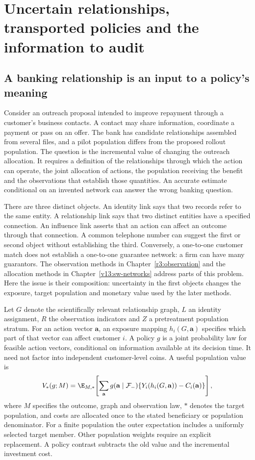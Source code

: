 \chapter{Uncertain relationships, transported policies and the information to audit}
\label{exec17:s7}

\section{A banking relationship is an input to a policy's meaning}
\label{exec17:s7-question}

Consider an outreach proposal intended to improve repayment through a customer's
business contacts. A contact may share information, coordinate a payment or pass
on an offer. The bank has candidate relationships assembled from several files,
and a pilot population differs from the proposed rollout population. The question
is the incremental value of changing the outreach allocation. It requires a
definition of the relationships through which the action can operate, the joint
allocation of actions, the population receiving the benefit and the observations
that establish those quantities. An accurate estimate conditional on an invented
network can answer the wrong banking question.

There are three distinct objects. An identity link says that two records refer
to the same entity. A relationship link says that two distinct entities have a
specified connection. An influence link asserts that an action can affect an
outcome through that connection. A common telephone number can suggest the first
or second object without establishing the third. Conversely, a one-to-one
customer match does not establish a one-to-one guarantee network: a firm can have
many guarantors. The observation methods in Chapter~\ref{r3:observation} and the
allocation methods in Chapter~\ref{v13:sw-networks} address parts of this problem.
Here the issue is their composition: uncertainty in the first objects changes
the exposure, target population and monetary value used by the later methods.

Let $G$ denote the scientifically relevant relationship graph, $L$ an identity
assignment, $R$ the observation indicators and $Z$ a pretreatment population
stratum. For an action vector $\mathbf a$, an exposure mapping
$h_i(G,\mathbf a)$ specifies which part of that vector can affect customer $i$.
A policy $g$ is a joint probability law for feasible action vectors, conditional
on information available at its decision time. It need not factor into
independent customer-level coins. A useful population value is
\begin{equation}
 V_*(g;M)=\E_{M,*}\!\left[
   \sum_{\mathbf a}g(\mathbf a\mid\mathcal F_{-})
     \{Y_i(h_i(G,\mathbf a))-C_i(\mathbf a)\}\right],
 \label{exec17:s7-target}
\end{equation}
where $M$ specifies the outcome, graph and observation law, $*$ denotes the
target population, and costs are allocated once to the stated beneficiary or
population denominator. For a finite population the outer expectation includes
a uniformly selected target member. Other population weights require an
explicit replacement. A policy contrast subtracts the old value and the
incremental investment cost.

